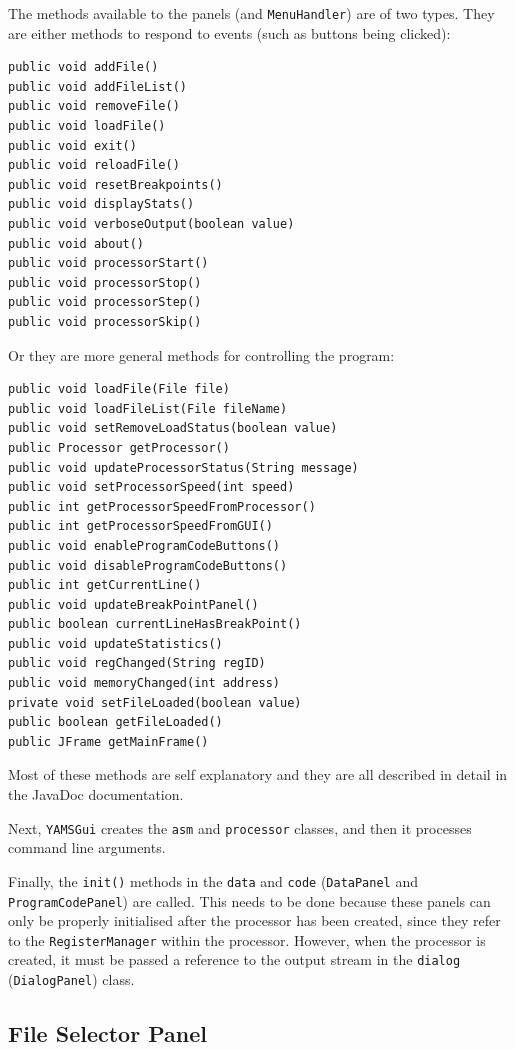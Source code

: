 The methods available to the panels (and {\tt MenuHandler}) are of two types. They are either methods to respond to events (such as buttons being clicked):

\begin{verbatim}
public void addFile()
public void addFileList()
public void removeFile()
public void loadFile()
public void exit()
public void reloadFile()
public void resetBreakpoints()
public void displayStats()
public void verboseOutput(boolean value)
public void about()
public void processorStart()
public void processorStop()
public void processorStep()
public void processorSkip()
\end{verbatim}

Or they are more general methods for controlling the program:

\begin{verbatim}
public void loadFile(File file)
public void loadFileList(File fileName)
public void setRemoveLoadStatus(boolean value)
public Processor getProcessor()
public void updateProcessorStatus(String message)
public void setProcessorSpeed(int speed)
public int getProcessorSpeedFromProcessor()
public int getProcessorSpeedFromGUI()
public void enableProgramCodeButtons()
public void disableProgramCodeButtons()
public int getCurrentLine()
public void updateBreakPointPanel()
public boolean currentLineHasBreakPoint()
public void updateStatistics()
public void regChanged(String regID)
public void memoryChanged(int address)
private void setFileLoaded(boolean value)
public boolean getFileLoaded()
public JFrame getMainFrame()
\end{verbatim}

Most of these methods are self explanatory and they are all described in detail in the JavaDoc documentation.

Next, {\tt YAMSGui} creates the {\tt asm} and {\tt processor} classes, and then it processes command line arguments.

Finally, the {\tt init()} methods in the {\tt data} and {\tt code} ({\tt DataPanel} and {\tt ProgramCodePanel}) are called. This needs to be done because these panels can only be properly initialised after the processor has been created, since they refer to the {\tt RegisterManager} within the processor.  However, when the processor is created, it must be passed a reference to the output stream in the {\tt dialog} ({\tt DialogPanel}) class.


\subsection{File Selector Panel}

